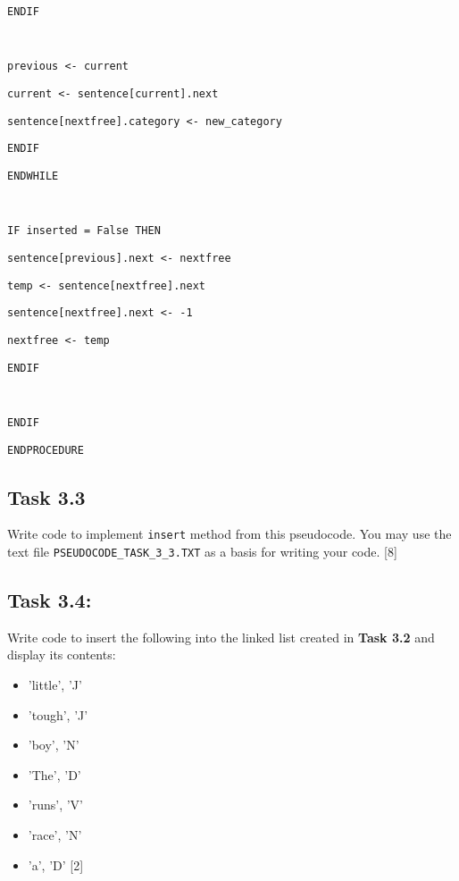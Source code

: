 \begin{minipage}[t]{1\columnwidth}
\texttt{\qquad{}\qquad{}\qquad{}\qquad{}ENDIF }

\texttt{\bigskip{}
}

\texttt{\qquad{}\qquad{}\qquad{}\qquad{}previous <- current }

\texttt{\qquad{}\qquad{}\qquad{}\qquad{}current <- sentence{[}current{]}.next}

\texttt{\qquad{}\qquad{}\qquad{}\qquad{}sentence{[}nextfree{]}.category
<- new\_category}

\texttt{\qquad{}\qquad{}\qquad{}ENDIF}

\texttt{\qquad{}\qquad{}ENDWHILE}

\texttt{\bigskip{}
}

\texttt{\qquad{}\qquad{}IF inserted = False THEN }

\texttt{\qquad{}\qquad{}\qquad{}sentence{[}previous{]}.next <-
nextfree }

\texttt{\qquad{}\qquad{}\qquad{}temp <- sentence{[}nextfree{]}.next }

\texttt{\qquad{}\qquad{}\qquad{}sentence{[}nextfree{]}.next <-
-1 }

\texttt{\qquad{}\qquad{}\qquad{}nextfree <- temp }

\texttt{\qquad{}\qquad{}ENDIF }

\texttt{\bigskip{}
}

\texttt{\qquad{}ENDIF}

\texttt{ENDPROCEDURE}%
\end{minipage}

\subsection*{Task 3.3}

Write code to implement \texttt{insert} method from this pseudocode.
You may use the text file \texttt{PSEUDOCODE\_TASK\_3\_3.TXT} as a
basis for writing your code. \hfill{}{[}8{]}

\subsection*{Task 3.4:}

Write code to insert the following into the linked list created in
\textbf{Task 3.2} and display its contents:
\begin{itemize}
\item 'little', 'J' 
\item 'tough', 'J' 
\item 'boy', 'N' 
\item 'The', 'D' 
\item 'runs', 'V' 
\item 'race', 'N' 
\item 'a', 'D' \hfill{}{[}2{]}
\end{itemize}

